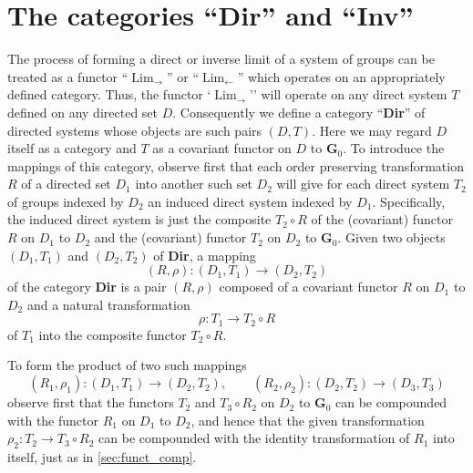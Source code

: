 \documentclass[11pt,a4paper]{report}
\DeclareMathOperator{\Lim}{Lim}
\begin{document}
\section{The categories ``\textbf{Dir}'' and ``\textbf{Inv}''}\label{sec:dir-inv}
The process of forming a direct or inverse limit of a system of groups can be treated as a functor ``$\Lim_{\rightarrow}$'' or
``$\Lim_{\leftarrow}$'' which operates on an appropriately defined category. Thus, the functor `$\Lim_{\rightarrow}$'' will
operate on any direct system $T$ defined on any directed set $D$. Consequently we define a category ``\textbf{Dir}'' of
directed systems whose objects are such pairs $(D,T)$. Here we may regard $D$ itself as a category and $T$ as a covariant
functor on $D$ to $\mathbf{G}_0$. To introduce the mappings of this category, observe first that each order preserving transformation
$R$ of a directed set $D_1$ into another such set $D_2$ will give for each direct system $T_2$ of groups indexed by $D_2$ an induced
direct system indexed by $D_1$. Specifically, the induced direct system is just the composite $T_2\circ R$ of the (covariant) functor
$R$ on $D_1$ to $D_2$ and the (covariant) functor $T_2$ on $D_2$ to $\mathbf{G}_0$. Given two objects $(D_1,T_1)$ and $(D_2,T_2)$
of \textbf{Dir}, a mapping
\begin{equation*}
	(R,\rho):(D_1,T_1)\rightarrow (D_2,T_2)
\end{equation*}
of the category \textbf{Dir} is a pair $(R,\rho)$ composed of a covariant functor $R$ on $D_1$ to $D_2$ and a natural transformation
\begin{equation*}
	\rho:T_1\rightarrow T_2\circ R
\end{equation*}
of $T_1$ into the composite functor $T_2\circ R$.

To form the product of two such mappings
\begin{equation}\label{eq:dir_comp}
	(R_1,\rho_1):(D_1,T_1)\rightarrow (D_2,T_2),\qquad (R_2,\rho_2):(D_2,T_2)\rightarrow (D_3,T_3)
\end{equation}
observe first that the functors $T_2$ and $T_3\circ R_2$ on $D_2$ to $\mathbf{G}_0$ can be compounded with the functor $R_1$ on $D_1$
to $D_2$, and hence that the given transformation $\rho_2:T_2\rightarrow T_3\circ R_2$ can be compounded with the identity transformation
of $R_1$ into itself, just as in \cref{sec:funct_comp}.
\end{document}
